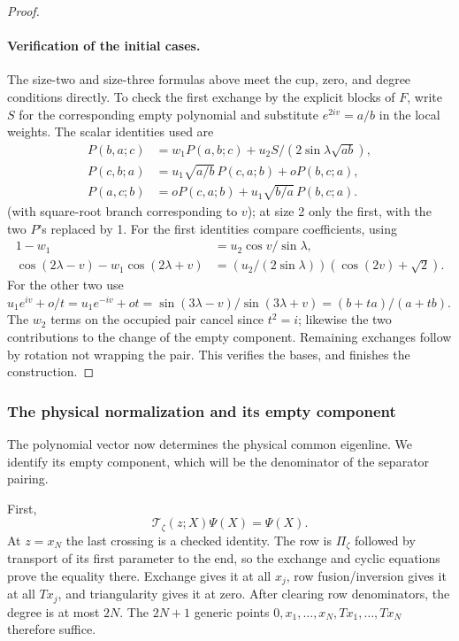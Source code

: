 \begin{proof}
\paragraph{Verification of the initial cases.}
The size-two and size-three formulas above meet the cup, zero, and
degree conditions directly. To check the first exchange by the explicit
blocks of \(F\), write \(S\) for the corresponding empty polynomial
and substitute \(e^{2iv}=a/b\) in the local weights. The scalar
identities used are
\[
\begin{aligned}
 P(b,a;c)&=w_1 P(a,b;c)+u_2 S/(2\sin\lambda\sqrt{ab}),\\
 P(c,b;a)&=u_1\sqrt{a/b}\,P(c,a;b)+o P(b,c;a),\\
 P(a,c;b)&=oP(c,a;b)+u_1\sqrt{b/a}\,P(b,c;a).
\end{aligned}
\]
(with square-root branch corresponding to \(v\)); at size 2 only the first, with the two \(P\)'s replaced by 1. For the first identities compare coefficients, using
\[
\begin{aligned}
 1-w_1&=u_2\cos v/\sin\lambda,\\
 \cos(2\lambda-v)-w_1\cos(2\lambda+v)
 &=(u_2/(2\sin\lambda))(\cos(2v)+\sqrt2).
\end{aligned}
\]
For the other two use \(u_1 e^{iv}+o/t=u_1 e^{-iv}+ot=\sin(3\lambda-v)/\sin(3\lambda+v)=(b+t a)/(a+t b)\). The \(w_2\) terms on the occupied pair cancel since \(t^2=i\); likewise the two contributions to the change of the empty component. Remaining exchanges follow by rotation not wrapping the pair. This verifies the bases, and finishes the construction.

\end{proof}

\subsubsection*{The physical normalization and its empty component}

The polynomial vector now determines the physical common eigenline.
We identify its empty component, which will be the denominator of the
separator pairing.

First,
\[
 \mathcal T_\zeta(z;X)\Psi(X)=\Psi(X).
\]
At \(z=x_N\) the last crossing is a checked identity. The row is
\(\Pi_\zeta\) followed by transport of its first parameter to the
end, so the exchange and cyclic equations prove the equality there.
Exchange gives it at all \(x_j\), row fusion/inversion gives it at
all \(Tx_j\), and triangularity gives it at zero. After clearing row
denominators, the degree is at most \(2N\). The \(2N+1\) generic
points \(0,x_1,\ldots,x_N,Tx_1,\ldots,Tx_N\) therefore suffice.

